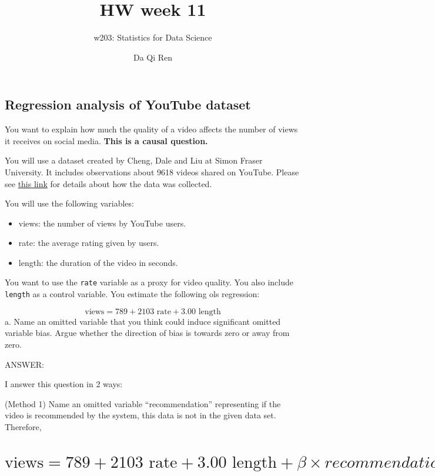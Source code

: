 \documentclass[
]{article}
\title{HW week 11}
\subtitle{w203: Statistics for Data Science}
\author{Da Qi Ren}
\date{}
\begin{document}
\maketitle

\newcommand{\E}{\text{E}}
\newcommand{\V}{\text{V}}
\newcommand{\R}{\mathbb{R}}
\newcommand{\Cov}{\mathbb{\text{Cov}}}

\hypertarget{regression-analysis-of-youtube-dataset}{%
\subsection{Regression analysis of YouTube
dataset}\label{regression-analysis-of-youtube-dataset}}

You want to explain how much the quality of a video affects the number
of views it receives on social media. \textbf{This is a causal
question.}

You will use a dataset created by Cheng, Dale and Liu at Simon Fraser
University. It includes observations about 9618 videos shared on
YouTube. Please see \href{http://netsg.cs.sfu.ca/youtubedata/}{this
link} for details about how the data was collected.

You will use the following variables:

\begin{itemize}
\item
  views: the number of views by YouTube users.
\item
  rate: the average rating given by users.
\item
  length: the duration of the video in seconds.
\end{itemize}

You want to use the \texttt{rate} variable as a proxy for video quality.
You also include \texttt{length} as a control variable. You estimate the
following ols regression:

\[\text{views} =   789 +  2103    \text{ rate} +      3.00 \text{ length} \]
a. Name an omitted variable that you think could induce significant
omitted variable bias. Argue whether the direction of bias is towards
zero or away from zero.

ANSWER:

I answer this question in 2 ways:

(Method 1) Name an omitted variable ``recommendation'' representing if
the video is recommended by the system, this data is not in the given
data set. Therefore,

\hypertarget{textviews-789-2103-text-rate-3.00-text-length-beta-times-recommendation}{%
\section{\texorpdfstring{\[\text{views} =   789 +  2103    \text{ rate} +      3.00 \text{ length} + \beta \times recommendation  \]}{\textbackslash text\{views\} =   789 +  2103    \textbackslash text\{ rate\} +      3.00 \textbackslash text\{ length\} + \textbackslash beta \textbackslash times recommendation  }}\label{textviews-789-2103-text-rate-3.00-text-length-beta-times-recommendation}}
\end{document}
